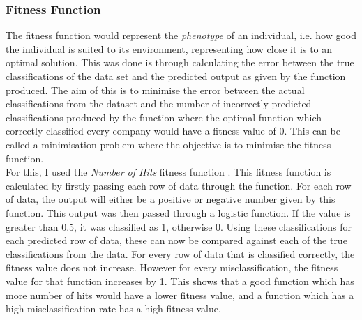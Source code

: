 \documentclass[11pt]{article}
\begin{document}
\subsubsection{Fitness Function}\label{subsubsec:fp}
The fitness function would represent the \textit{phenotype} of an individual, i.e. how good the individual is suited to its environment, representing how close it is to an optimal solution. This was done is through calculating the error between the true classifications of the data set and the predicted output as given by the function produced. The aim of this is to minimise the error between the actual classifications from the dataset and the number of incorrectly predicted classifications produced by the function where the optimal function which correctly classified every company would have a fitness value of 0. This can be called a minimisation problem where the objective is to minimise the fitness function. \\
For this, I used the \textit{Number of Hits} fitness function \cite{?} . This fitness function is calculated by firstly passing each row of data through the function. For each row of data, the output will either be a positive or negative number given by this function. This output was then passed through a logistic function. If the value is greater than 0.5, it was classified as 1, otherwise 0. Using these classifications for each predicted row of data, these can now be compared against each of the true classifications from the data. For every row of data that is classified correctly, the fitness value does not increase. However for every misclassification, the fitness value for that function increases by 1. This shows that a good function which has more number of hits would have a lower fitness value, and a function which has a high misclassification rate has a high fitness value. 
\end{document}

